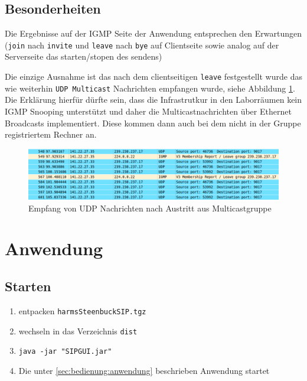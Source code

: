 \documentclass[10pt]{scrartcl}
\begin{document}
		
	
	
	\subsection{Besonderheiten}\label{subsec:besonderheiten}
	
	Die Ergebnisse auf der IGMP Seite der Anwendung entsprechen den Erwartungen (\verb!join! nach \verb!invite! und \verb!leave! nach \verb!bye! auf Clientseite sowie analog auf der Serverseite das starten/stopen des sendens)
	
	Die einzige Ausnahme ist das nach dem clientseitigen \verb!leave! festgestellt wurde das wie weiterhin \verb!UDP Multicast! Nachrichten empfangen wurde, siehe Abbildung \ref{img:cap1}. 
	Die Erklärung hierfür dürfte sein, dass die Infrastrutkur in den Laborräumen kein IGMP Snooping unterstützt und daher die Multicastnachrichten über Ethernet Broadcasts implementiert. Diese kommen dann auch bei dem nicht in der Gruppe registriertem Rechner an.
	
	
	\begin{figure}[htb]
        \centering
         \includegraphics[width=\textwidth]{img/udp_after_leaving}
         \caption{Empfang von UDP Nachrichten nach Austritt aus Multicastgruppe}
        \label{img:cap1}
	\end{figure}	



\section{Anwendung}

\subsection{Starten}
\begin{enumerate}
	\item entpacken \verb!harmsSteenbuckSIP.tgz!
	\item wechseln in das Verzeichnis \verb!dist!
	\item \verb!java -jar "SIPGUI.jar"!
	\item Die unter \ref{sec:bedienung:anwendung} beschrieben Anwendung startet
\end{enumerate}
\end{document}

